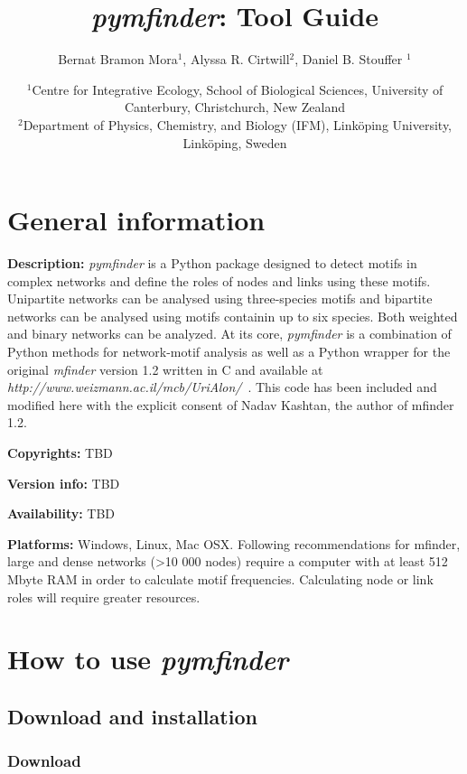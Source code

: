 \documentclass[12pt]{article}
\title{\emph{pymfinder}: Tool Guide}
\author{Bernat Bramon Mora$^{1}$, Alyssa R. Cirtwill$^{2}$, Daniel B. Stouffer $^{1}$}
\date{\small
$^1$Centre for Integrative Ecology, School of Biological Sciences, University of Canterbury, Christchurch, New Zealand\\
\medskip
$^2$Department of Physics, Chemistry, and Biology (IFM), Link\"{o}ping University, Link\"{o}ping, Sweden\\ }
\begin{document}
 
\maketitle 
\raggedright
\setlength{\parindent}{15pt} 

\newpage



\section{General information}

	\textbf{Description:} \textit{pymfinder} is a Python package designed to detect motifs in complex networks and define the roles of nodes and links using these motifs. Unipartite networks can be analysed using three-species motifs and bipartite networks can be analysed using motifs containin up to six species. Both weighted and binary networks can be analyzed. At its core, \emph{pymfinder} is a combination of Python methods for network-motif analysis as well as a Python wrapper for the original \emph{mfinder} version 1.2 written in C and available at \emph{http://www.weizmann.ac.il/mcb/UriAlon/}~\citep{Alonwebsite}. This code has been included and modified here with the explicit consent of Nadav Kashtan, the author of mfinder 1.2.

	\textbf{Copyrights:} TBD

	\textbf{Version info:} TBD

	\textbf{Availability:} TBD

	\textbf{Platforms:} Windows, Linux, Mac OSX. Following recommendations for mfinder, large and dense networks (\textgreater10 000 nodes) require a computer with at least 512 Mbyte RAM in order to calculate motif frequencies. Calculating node or link roles will require greater resources.


\section{How to use \emph{pymfinder}}

	\subsection{Download and installation}

		\subsubsection{Download}
\end{document}
